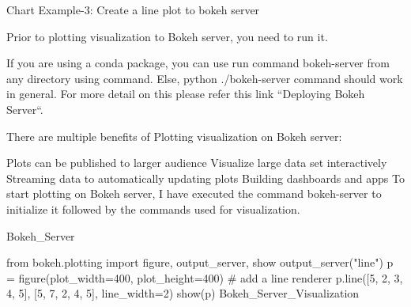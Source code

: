  

Chart Example-3: Create a line plot to bokeh server

Prior to plotting visualization to Bokeh server, you need to run it.

If you are using a conda package, you can use run command bokeh-server from any directory 
using command. Else, python ./bokeh-server command should work in general. For more detail on this 
please refer this link “Deploying Bokeh Server“.

There are multiple benefits of Plotting visualization on Bokeh server:

Plots can be published to larger audience
Visualize large data set interactively
Streaming data to automatically updating plots
Building dashboards and apps
To start plotting on Bokeh server, I have executed the command bokeh-server to initialize it followed by 
the commands used for visualization.

Bokeh_Server

from bokeh.plotting import figure, output_server, show
output_server("line")
p = figure(plot_width=400, plot_height=400)
# add a line renderer
p.line([5, 2, 3, 4, 5], [5, 7, 2, 4, 5], line_width=2)
show(p)
Bokeh_Server_Visualization
